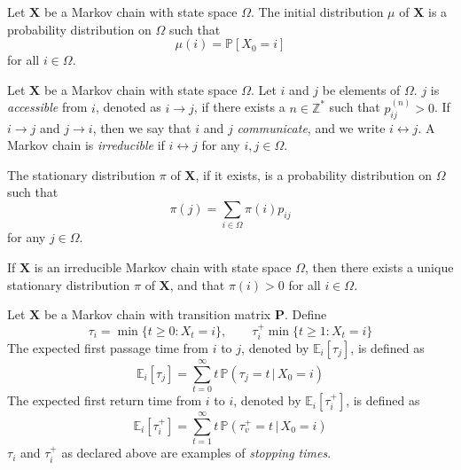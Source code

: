 \begin{definition}
  \label{def:5}
  Let $\mathbf{X}$ be a Markov chain with state space
  $\Omega$. The initial distribution $\mu$ of $\mathbf{X}$ is a probability
  distribution on $\Omega$ such that 
  \begin{equation}
    \label{eq:14}
    \mu(i) = \mathbb{P}[X_0 = i]
  \end{equation}
  for all $i \in \Omega$. 
\end{definition}

\begin{definition}
  \label{def:7}
  Let $\mathbf{X}$ be a Markov chain with state space $\Omega$. Let
  $i$ and $j$ be elements of $\Omega$. $j$ is
  {\em accessible} from $i$, denoted as $i \rightarrow j$, if there
  exists a $n \in \mathbb{Z}^{*}$ such that $p_{ij}^{(n)} > 0$. If $i
  \rightarrow j$ and $j \rightarrow i$, then we say that $i$ and $j$
  {\em communicate}, and we write $i \leftrightarrow j$. A Markov chain is
  {\em irreducible} if $i \leftrightarrow j$ for any $i,j \in \Omega$.
\end{definition}
\begin{definition}
  \label{def:2}
  The stationary distribution $\pi$ of
  $\mathbf{X}$, if it exists, is a probability distribution on
  $\Omega$ such that
  \begin{equation}
    \label{eq:15}
    \pi(j) = \sum_{i \in \Omega}{\pi(i) p_{ij}}
  \end{equation}
  for any $j \in \Omega$. 
\end{definition}

\begin{proposition}
  \label{prop:3}
  If $\mathbf{X}$ is an irreducible Markov chain with state space
  $\Omega$, then there exists a unique stationary distribution $\pi$
  of $\mathbf{X}$, and that $\pi(i) > 0$ for all $i \in \Omega$. 
\end{proposition}

\begin{definition}
  \label{def:3}
  Let $\mathbf{X}$ be a Markov chain
  with transition matrix $\mathbf{P}$. Define 
  \begin{equation}
    \label{eq:5}
    \tau_i = \min\{ t \geq 0 \colon X_t = i \}, \qquad \tau_i^{+} \min
    \{ t \geq 1 \colon X_t = i \}
  \end{equation}
  The expected first passage time from $i$ to $j$, denoted by
  $\mathbb{E}_{i}[\tau_j]$, is defined as
  \begin{equation}
    \label{eq:6}
    \mathbb{E}_{i}[\tau_j] = \sum_{t = 0}^{\infty}{t \, \mathbb{P}(\tau_j =
      t \,|\, X_0 = i)}
  \end{equation}
  The expected first return time from $i$ to $i$, denoted by
  $\mathbb{E}_{i}[\tau_i^{+}]$, is defined as
  \begin{equation}
    \label{eq:7}
    \mathbb{E}_{i}[\tau_i^{+}] = \sum_{t = 1}^{\infty}{t \,
      \mathbb{P}(\tau_v^{+} = t \,|\, X_0 = i)}
  \end{equation}
  $\tau_i$ and $\tau_{i}^{+}$ as declared above are examples of {\em
    stopping times}. 
\end{definition}

